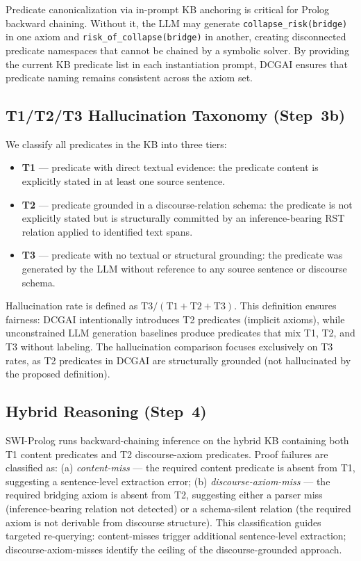 \documentclass[11pt,letterpaper]{article}
\begin{document}
Predicate canonicalization via in-prompt KB anchoring is critical for Prolog backward chaining. Without it, the LLM
may generate \texttt{collapse\_risk(bridge)} in one axiom and \texttt{risk\_of\_collapse(bridge)} in another,
creating disconnected predicate namespaces that cannot be chained by a symbolic solver. By providing the current KB
predicate list in each instantiation prompt, DCGAI ensures that predicate naming remains consistent across the axiom
set.

\subsection{T1/T2/T3 Hallucination Taxonomy (Step~3b)}
\label{sec:taxonomy}

We classify all predicates in the KB into three tiers:
\begin{itemize}
  \item \textbf{T1} --- predicate with direct textual evidence: the predicate content is explicitly stated in at
    least one source sentence.
  \item \textbf{T2} --- predicate grounded in a discourse-relation schema: the predicate is not explicitly stated
    but is structurally committed by an inference-bearing RST relation applied to identified text spans.
  \item \textbf{T3} --- predicate with no textual or structural grounding: the predicate was generated by the LLM
    without reference to any source sentence or discourse schema.
\end{itemize}
Hallucination rate is defined as $\text{T3}/(\text{T1}+\text{T2}+\text{T3})$. This definition ensures fairness:
DCGAI intentionally introduces T2 predicates (implicit axioms), while unconstrained LLM generation baselines produce
predicates that mix T1, T2, and T3 without labeling. The hallucination comparison focuses exclusively on T3 rates,
as T2 predicates in DCGAI are structurally grounded (not hallucinated by the proposed definition).

\subsection{Hybrid Reasoning (Step~4)}

SWI-Prolog runs backward-chaining inference on the hybrid KB containing both T1 content predicates and T2
discourse-axiom predicates. Proof failures are classified as: (a) \textit{content-miss} --- the required content
predicate is absent from T1, suggesting a sentence-level extraction error; (b) \textit{discourse-axiom-miss} --- the
required bridging axiom is absent from T2, suggesting either a parser miss (inference-bearing relation not detected)
or a schema-silent relation (the required axiom is not derivable from discourse structure). This classification
guides targeted re-querying: content-misses trigger additional sentence-level extraction;
discourse-axiom-misses identify the ceiling of the discourse-grounded approach.
\end{document}
